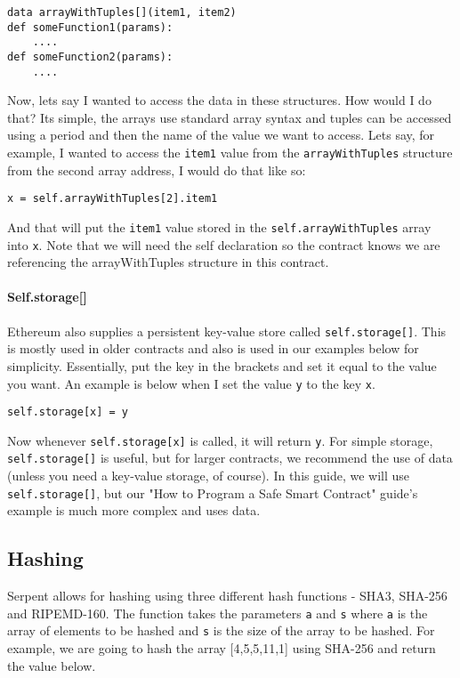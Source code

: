 \documentclass[12pt]{article}
\begin{document}
\begin{verbatim}
data arrayWithTuples[](item1, item2)
def someFunction1(params):
	....
def someFunction2(params):
	....
\end{verbatim}

Now, lets say I wanted to access the data in these structures. How would I do that? Its simple, the arrays use standard array syntax and tuples can be accessed using a period and then the name of the value we want to access. Lets say, for example, I wanted to access the \texttt{item1} value from the \texttt{arrayWithTuples} structure from the second array address, I would do that like so:

\begin{verbatim}
x = self.arrayWithTuples[2].item1
\end{verbatim}

And that will put the \texttt{item1} value stored in the \texttt{self.arrayWithTuples} array into \texttt{x}. \cite{Serpent} Note that we will need the self declaration so the contract knows we are referencing the arrayWithTuples structure in this contract.

\paragraph{Self.storage[]}
Ethereum also supplies a persistent key-value store called \texttt{self.storage[]}. This is mostly used in older contracts and also is used in our examples below for simplicity. Essentially, put the key in the brackets and set it equal to the value you want. An example is below when I set the value \texttt{y} to the key \texttt{x}.

\begin{verbatim}
self.storage[x] = y
\end{verbatim}

Now whenever \texttt{self.storage[x]} is called, it will return \texttt{y}. For simple storage, \texttt{self.storage[]} is useful, but for larger contracts, we recommend the use of data (unless you need a key-value storage, of course). \cite{Serpent, Serpent1.0(old)} In this guide, we will use \texttt{self.storage[]}, but our "How to Program a Safe Smart Contract" guide's example is much more complex and uses data. 

\subsection{Hashing}
Serpent allows for hashing using three different hash functions - SHA3, SHA-256 and RIPEMD-160. The function takes the parameters \texttt{a} and \texttt{s} where \texttt{a} is the array of elements to be hashed and \texttt{s} is the size of the array to be hashed. For example, we are going to hash the array [4,5,5,11,1] using SHA-256 and return the value below. \cite{Serpent}
\end{document}
